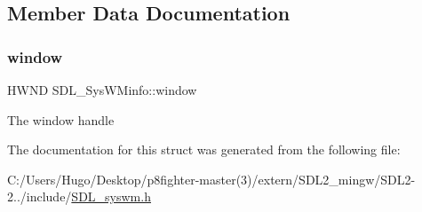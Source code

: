 \subsection{Member Data Documentation}
\mbox{\label{struct_s_d_l___sys_w_minfo_af06225591ff07e837bbd037728a525b9}} 
\subsubsection{\texorpdfstring{window}{window}}
{\footnotesize\ttfamily H\+W\+ND S\+D\+L\+\_\+\+Sys\+W\+Minfo\+::window}

The window handle 

The documentation for this struct was generated from the following file\+:\begin{DoxyCompactItemize}
\item 
C\+:/\+Users/\+Hugo/\+Desktop/p8fighter-\/master(3)/extern/\+S\+D\+L2\+\_\+mingw/\+S\+D\+L2-\/2../include/\hyperlink{_s_d_l__syswm_8h}{S\+D\+L\+\_\+syswm.\+h}\end{DoxyCompactItemize}
